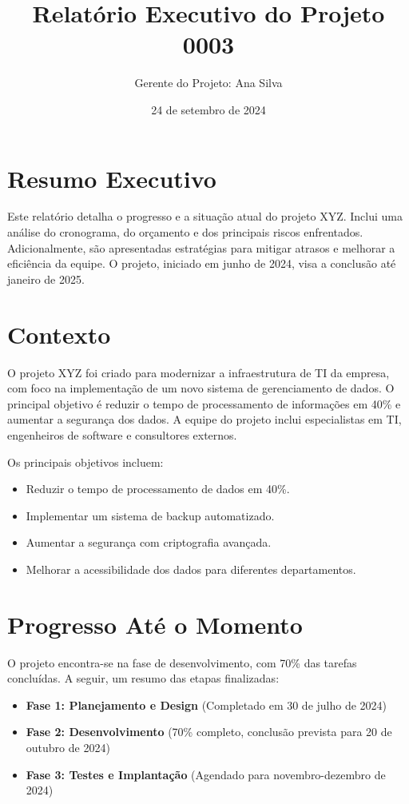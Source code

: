 \documentclass[12pt]{article}
\title{Relatório Executivo do Projeto 0003}
\author{Gerente do Projeto: Ana Silva}
\date{24 de setembro de 2024}
\begin{document}
\maketitle

\tableofcontents
\newpage

\section*{Resumo Executivo}
Este relatório detalha o progresso e a situação atual do projeto XYZ. Inclui uma análise do cronograma, do orçamento e dos principais riscos enfrentados. Adicionalmente, são apresentadas estratégias para mitigar atrasos e melhorar a eficiência da equipe. O projeto, iniciado em junho de 2024, visa a conclusão até janeiro de 2025.

\section*{Contexto}
O projeto XYZ foi criado para modernizar a infraestrutura de TI da empresa, com foco na implementação de um novo sistema de gerenciamento de dados. O principal objetivo é reduzir o tempo de processamento de informações em 40\% e aumentar a segurança dos dados. A equipe do projeto inclui especialistas em TI, engenheiros de software e consultores externos.

Os principais objetivos incluem:
\begin{itemize}
    \item Reduzir o tempo de processamento de dados em 40\%.
    \item Implementar um sistema de backup automatizado.
    \item Aumentar a segurança com criptografia avançada.
    \item Melhorar a acessibilidade dos dados para diferentes departamentos.
\end{itemize}

\section*{Progresso Até o Momento}
O projeto encontra-se na fase de desenvolvimento, com 70\% das tarefas concluídas. A seguir, um resumo das etapas finalizadas:

\begin{itemize}
    \item \textbf{Fase 1: Planejamento e Design} (Completado em 30 de julho de 2024)
    \item \textbf{Fase 2: Desenvolvimento} (70\% completo, conclusão prevista para 20 de outubro de 2024)
    \item \textbf{Fase 3: Testes e Implantação} (Agendado para novembro-dezembro de 2024)
\end{itemize}
\end{document}
